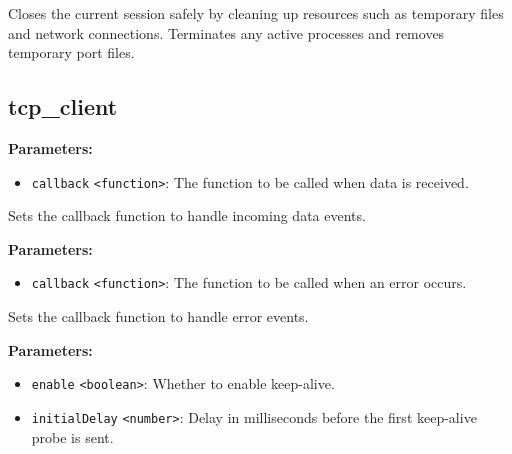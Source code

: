 \documentclass[12pt,a4paper]{article}
\begin{document}
\vspace{5mm}
\noindent {}


\noindent Closes the current session safely by cleaning up resources such as temporary files and network connections.
Terminates any active processes and removes temporary port files.


\subsection{tcp\_client}
\vspace{5mm}
\noindent {}


\noindent \textbf{Parameters:}
\begin{itemize}
  \item \texttt{callback} \texttt{<function>}: The function to be called when data is received.
\end{itemize}

\noindent Sets the callback function to handle incoming data events.

\vspace{5mm}
\noindent {}


\noindent \textbf{Parameters:}
\begin{itemize}
  \item \texttt{callback} \texttt{<function>}: The function to be called when an error occurs.
\end{itemize}

\noindent Sets the callback function to handle error events.

\vspace{5mm}
\noindent {}


\noindent \textbf{Parameters:}
\begin{itemize}
  \item \texttt{enable} \texttt{<boolean>}: Whether to enable keep-alive.
  \item \texttt{initialDelay} \texttt{<number>}: Delay in milliseconds before the first keep-alive probe is sent.
\end{itemize}
\end{document}
